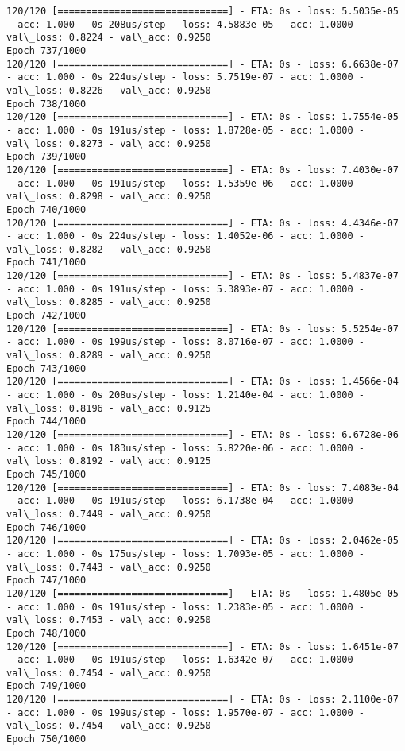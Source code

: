 \documentclass[11pt]{article}
\begin{document}
\begin{Verbatim}[commandchars=\\\{\}]
120/120 [==============================] - ETA: 0s - loss: 5.5035e-05 - acc: 1.000 - 0s 208us/step - loss: 4.5883e-05 - acc: 1.0000 - val\_loss: 0.8224 - val\_acc: 0.9250
Epoch 737/1000
120/120 [==============================] - ETA: 0s - loss: 6.6638e-07 - acc: 1.000 - 0s 224us/step - loss: 5.7519e-07 - acc: 1.0000 - val\_loss: 0.8226 - val\_acc: 0.9250
Epoch 738/1000
120/120 [==============================] - ETA: 0s - loss: 1.7554e-05 - acc: 1.000 - 0s 191us/step - loss: 1.8728e-05 - acc: 1.0000 - val\_loss: 0.8273 - val\_acc: 0.9250
Epoch 739/1000
120/120 [==============================] - ETA: 0s - loss: 7.4030e-07 - acc: 1.000 - 0s 191us/step - loss: 1.5359e-06 - acc: 1.0000 - val\_loss: 0.8298 - val\_acc: 0.9250
Epoch 740/1000
120/120 [==============================] - ETA: 0s - loss: 4.4346e-07 - acc: 1.000 - 0s 224us/step - loss: 1.4052e-06 - acc: 1.0000 - val\_loss: 0.8282 - val\_acc: 0.9250
Epoch 741/1000
120/120 [==============================] - ETA: 0s - loss: 5.4837e-07 - acc: 1.000 - 0s 191us/step - loss: 5.3893e-07 - acc: 1.0000 - val\_loss: 0.8285 - val\_acc: 0.9250
Epoch 742/1000
120/120 [==============================] - ETA: 0s - loss: 5.5254e-07 - acc: 1.000 - 0s 199us/step - loss: 8.0716e-07 - acc: 1.0000 - val\_loss: 0.8289 - val\_acc: 0.9250
Epoch 743/1000
120/120 [==============================] - ETA: 0s - loss: 1.4566e-04 - acc: 1.000 - 0s 208us/step - loss: 1.2140e-04 - acc: 1.0000 - val\_loss: 0.8196 - val\_acc: 0.9125
Epoch 744/1000
120/120 [==============================] - ETA: 0s - loss: 6.6728e-06 - acc: 1.000 - 0s 183us/step - loss: 5.8220e-06 - acc: 1.0000 - val\_loss: 0.8192 - val\_acc: 0.9125
Epoch 745/1000
120/120 [==============================] - ETA: 0s - loss: 7.4083e-04 - acc: 1.000 - 0s 191us/step - loss: 6.1738e-04 - acc: 1.0000 - val\_loss: 0.7449 - val\_acc: 0.9250
Epoch 746/1000
120/120 [==============================] - ETA: 0s - loss: 2.0462e-05 - acc: 1.000 - 0s 175us/step - loss: 1.7093e-05 - acc: 1.0000 - val\_loss: 0.7443 - val\_acc: 0.9250
Epoch 747/1000
120/120 [==============================] - ETA: 0s - loss: 1.4805e-05 - acc: 1.000 - 0s 191us/step - loss: 1.2383e-05 - acc: 1.0000 - val\_loss: 0.7453 - val\_acc: 0.9250
Epoch 748/1000
120/120 [==============================] - ETA: 0s - loss: 1.6451e-07 - acc: 1.000 - 0s 191us/step - loss: 1.6342e-07 - acc: 1.0000 - val\_loss: 0.7454 - val\_acc: 0.9250
Epoch 749/1000
120/120 [==============================] - ETA: 0s - loss: 2.1100e-07 - acc: 1.000 - 0s 199us/step - loss: 1.9570e-07 - acc: 1.0000 - val\_loss: 0.7454 - val\_acc: 0.9250
Epoch 750/1000

\end{Verbatim}
\end{document}
